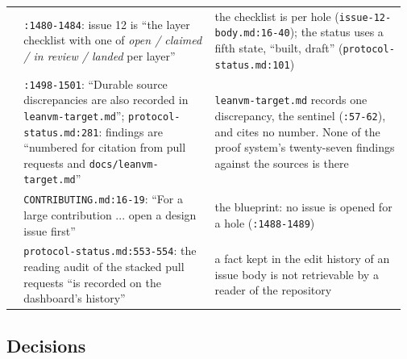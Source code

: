 {\begin{longtable}{@{}>{\raggedright\arraybackslash}p{0.029\linewidth}>{\raggedright\arraybackslash}p{0.470\linewidth}>{\raggedright\arraybackslash}p{0.470\linewidth}@{}}
5 & \texttt{:\allowbreak{}1480-\allowbreak{}1484}: issue 12 is ``the layer checklist with one of \emph{open / claimed / in review / landed} per layer'' & the checklist is per hole (\texttt{issue-\allowbreak{}12-\allowbreak{}body.\allowbreak{}md:\allowbreak{}16-\allowbreak{}40}); the status uses a fifth state, ``built, draft'' (\texttt{protocol-\allowbreak{}status.\allowbreak{}md:\allowbreak{}101}) \\\addlinespace[2pt]
6 & \texttt{:\allowbreak{}1498-\allowbreak{}1501}: ``Durable source discrepancies are also recorded in \texttt{leanvm-\allowbreak{}target.\allowbreak{}md}''; \texttt{protocol-\allowbreak{}status.\allowbreak{}md:\allowbreak{}281}: findings are ``numbered for citation from pull requests and \texttt{docs/\allowbreak{}leanvm-\allowbreak{}target.\allowbreak{}md}'' & \texttt{leanvm-\allowbreak{}target.\allowbreak{}md} records one discrepancy, the sentinel (\texttt{:\allowbreak{}57-\allowbreak{}62}), and cites no number. None of the proof system's twenty-seven findings against the sources is there \\\addlinespace[2pt]
7 & \texttt{CONTRIBUTING.\allowbreak{}md:\allowbreak{}16-\allowbreak{}19}: ``For a large contribution ... open a design issue first'' & the blueprint: no issue is opened for a hole (\texttt{:\allowbreak{}1488-\allowbreak{}1489}) \\\addlinespace[2pt]
8 & \texttt{protocol-\allowbreak{}status.\allowbreak{}md:\allowbreak{}553-\allowbreak{}554}: the reading audit of the stacked pull requests ``is recorded on the dashboard's history'' & a fact kept in the edit history of an issue body is not retrievable by a reader of the repository \\
\end{longtable}}

\subsection{Decisions}\label{sec:docs-decisions}

